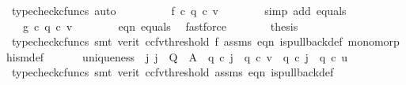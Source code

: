 \begin{isabellebody}
\ {\isacharparenleft}{\kern0pt}typecheck{\isacharunderscore}{\kern0pt}cfuncs{\isacharcomma}{\kern0pt}\ auto{\isacharparenright}{\kern0pt}\isanewline
\ \ \ \ \isamarkupfalse%
\ \isamarkupfalse%
\ {\isachardoublequoteopen}{\isachardot}{\kern0pt}{\isachardot}{\kern0pt}{\isachardot}{\kern0pt}\ {\isacharequal}{\kern0pt}\ f\ {\isasymcirc}\isactrlsub c\ q{}\ {\isasymcirc}\isactrlsub c\ v{\isachardoublequoteclose}\isanewline
\ \ \ \ \ \ \isamarkupfalse%
\ {\isacharparenleft}{\kern0pt}simp\ add{\isacharcolon}{\kern0pt}\ equals{\isacharparenright}{\kern0pt}\isanewline
\ \ \ \ \isamarkupfalse%
\ \isamarkupfalse%
\ {\isachardoublequoteopen}{\isachardot}{\kern0pt}{\isachardot}{\kern0pt}{\isachardot}{\kern0pt}\ {\isacharequal}{\kern0pt}\ g\ {\isasymcirc}\isactrlsub c\ q{}\ {\isasymcirc}\isactrlsub c\ v{\isachardoublequoteclose}\isanewline
\ \ \ \ \ \ \isamarkupfalse%
\ eqn{}\ equals\ \isamarkupfalse%
\ fastforce\isanewline
\ \ \ \ \isamarkupfalse%
\ \isamarkupfalse%
\ {\isacharquery}{\kern0pt}thesis\isanewline
\ \ \ \ \ \ \isamarkupfalse%
\ {\isacharparenleft}{\kern0pt}typecheck{\isacharunderscore}{\kern0pt}cfuncs{\isacharcomma}{\kern0pt}\ smt\ {\isacharparenleft}{\kern0pt}verit{\isacharcomma}{\kern0pt}\ ccfv{\isacharunderscore}{\kern0pt}threshold{\isacharparenright}{\kern0pt}\ f{}\ assms{\isacharparenleft}{\kern0pt}{}{\isacharcomma}{\kern0pt}{}{\isacharparenright}{\kern0pt}\ eqn{}\ is{\isacharunderscore}{\kern0pt}pullback{\isacharunderscore}{\kern0pt}def\ monomorphism{\isacharunderscore}{\kern0pt}def{}{\isacharparenright}{\kern0pt}\isanewline
\ \ \isamarkupfalse%
\isanewline
\ \ \isamarkupfalse%
\ uniqueness{\isacharcolon}{\kern0pt}\ {\isachardoublequoteopen}{\isasymexists}{\isacharbang}{\kern0pt}\ j{\isachardot}{\kern0pt}\ {\isacharparenleft}{\kern0pt}j\ {\isacharcolon}{\kern0pt}\ Q\ {\isasymrightarrow}\ A\ {\isasymand}\ q{}\ {\isasymcirc}\isactrlsub c\ j\ {\isacharequal}{\kern0pt}\ q{}\ {\isasymcirc}\isactrlsub c\ v\ {\isasymand}\ q{}\ {\isasymcirc}\isactrlsub c\ j\ {\isacharequal}{\kern0pt}\ q{}\ {\isasymcirc}\isactrlsub c\ u{\isacharparenright}{\kern0pt}{\isachardoublequoteclose}\isanewline
\ \ \ \isamarkupfalse%
\ {\isacharparenleft}{\kern0pt}typecheck{\isacharunderscore}{\kern0pt}cfuncs{\isacharcomma}{\kern0pt}\ smt\ {\isacharparenleft}{\kern0pt}verit{\isacharcomma}{\kern0pt}\ ccfv{\isacharunderscore}{\kern0pt}threshold{\isacharparenright}{\kern0pt}\ assms{\isacharparenleft}{\kern0pt}{}{\isacharparenright}{\kern0pt}\ eqn{}\ is{\isacharunderscore}{\kern0pt}pullback{\isacharunderscore}{\kern0pt}def{\isacharparenright}{\kern0pt}\isanewline

\end{isabellebody}
